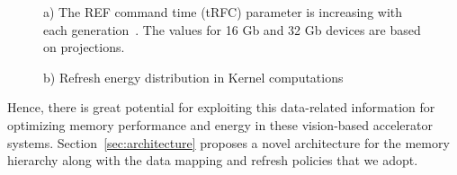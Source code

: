 \begin{figure}[ht!]
\begin{minipage}[b]{1\linewidth}
\centering
{}
\caption{\label{fig:refreshTrends}a) The REF command time (tRFC) parameter is increasing with each generation~\cite{jedec-sdram-standards}. The values for 16 Gb and 32 Gb devices are based on projections.}
\vspace{0.1in}
\end{minipage}
\addtocounter{figure}{-1}
\begin{minipage}[b]{1\linewidth}
\centering
{}
\caption{\label{fig:refreshTrends}b) Refresh energy distribution in Kernel computations}
\end{minipage}
\vspace{-0.2in}
\end{figure}

Hence, there is great potential for exploiting this data-related information for optimizing memory performance and energy in these vision-based accelerator systems. Section~\ref{sec:architecture} proposes a novel architecture for the memory hierarchy along with the data mapping and refresh policies that we adopt.
